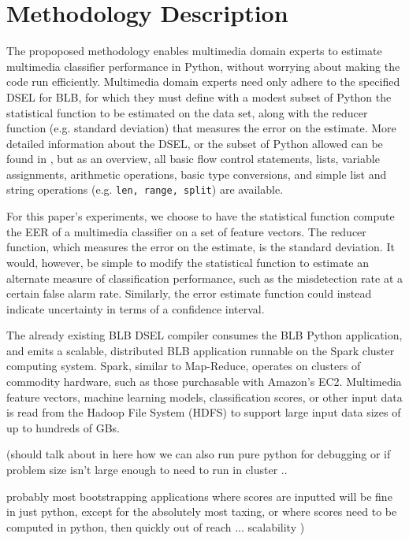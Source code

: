 \section{Methodology Description}

The propoposed methodology enables multimedia domain experts to estimate multimedia classifier performance in Python, without worrying about making the code run efficiently. 
Multimedia domain experts need only adhere to the specified DSEL for BLB, for which they must define with a modest subset of Python the statistical function to be estimated on the data set, along with the reducer function (e.g. standard deviation) that measures the error on the estimate.
More detailed information about the DSEL, or the subset of Python allowed can be found in \cite{pbirsinger2013}, but as an overview, all basic flow control statements, lists, variable assignments, arithmetic operations, basic type conversions, and simple list and string operations (e.g. \texttt{len, range, split}) are available. 

For this paper's experiments, we choose to have the statistical function compute the EER of a multimedia classifier on a set of feature vectors. 
The reducer function, which measures the error on the estimate, is the standard deviation. 
It would, however, be simple to modify the statistical function to estimate an alternate measure of classification performance, such as the misdetection rate at a certain false alarm rate. 
Similarly, the error estimate function could instead indicate uncertainty in terms of a confidence interval.  

The already existing BLB DSEL compiler consumes the BLB Python application, and emits
a scalable, distributed BLB application runnable on the Spark cluster computing system. 
Spark, similar to Map-Reduce, operates on clusters of commodity hardware, such as those purchasable with
Amazon's EC2. Multimedia feature vectors, machine learning models, classification scores, or other input
data is read from the Hadoop File System (HDFS) to support large input data sizes of up to hundreds of GBs. 

(should talk about in here how we can also run pure python for debugging or if problem size isn't large enough to need to run in cluster .. 

probably most bootstrapping applications where scores are inputted will be
fine in just python, except for the absolutely most taxing, or where scores need
to be computed in python, then quickly out of reach ... scalability  )